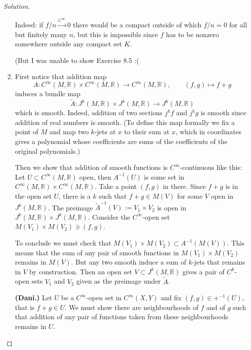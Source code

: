 \begin{proof}[Solution]
\begin{enumerate}[label=(\alph*)]
	Indeed: if \(f/n \xrightarrow{C^\infty} 0\) there would be a compact outside of which \(f/n=0\) for all but finitely many \(n\), but this is impossible since \(f\) has to be nonzero somewhere outside any compact set \(K\).

	(But I was unable to show Exercise 8.5 :(

\item 
	First notice that addition map
	\[A: C^\infty(M,\mathbb{R}) \times C^\infty(M,\mathbb{R}) \to C^\infty(M,\mathbb{R}),\qquad  (f,g)\mapsto  f+g\]
	induces a bundle map
\[\tilde{A}:J^{k}(M,\mathbb{R})\times J^{k}(M,\mathbb{R})\longrightarrow J^{k}(M,\mathbb{R})\]
which is smooth. Indeed, addition of two sections \(j^kf\) and \(j^kg\) is smooth since addition of real numbers is smooth. (To define this map formally we fix a point of \(M\) and map two \(k\)-jets at \(x\) to their sum at \(x\), which in coordinates gives a polynomial whose coefficients are sums of the coefficients of the original polynomials.)

Then we show that addition of smooth functions is \(C^\infty\)-continuous like this: Let \(U \subset C^\infty(M,\mathbb{R})\) open, then \(A^{-1}(U)\) is some set in \(C^\infty(M,\mathbb{R}) \times C^\infty (M,\mathbb{R})\). Take a point \((f,g)\) in there. Since \(f+g\) is in the open set \(U\), there is a \(k\) such that \(f+g \in M(V)\) for some \(V\) open in \(J^k(M,\mathbb{R})\). The preimage \(\tilde{A}^{-1}(V):=V_1\times V_2\) is open in \(J^k(M,\mathbb{R})\times J^{k}(M,\mathbb{R})\). Consider the \(C^\infty\)-open set \(M(V_1) \times M(V_2) \ni (f,g)\).

To conclude we must check that \(M(V_1)\times M(V_2) \subset A^{-1}(M(V))\). This means that the sum of any pair of smooth functions in \(M(V_1) \times M(V_2)\) remains in \(M(V)\). But any two smooth induce a sum of \(k\)-jets that remains in \(V\) by construction.
\iffalse
	Then an open set \(V \subset J^{k}(M,\mathbb{R})\) gives a pair of \(C^k\)-open sets \(V_1\) and \(V_2\) given as the preimage under \(\tilde{A}\). 

	\textbf{(Dani.)} Let \(U\) be a \(C^\infty\)-open set in \(C^\infty(X,Y)\) and fix \((f,g) \in +^{-1}(U)\), that is \(f+g \in U\). We must show there are neighbourhoods of \(f\) and of \(g\) such that addition of any pair of functions taken from these neighbourhoods remains in \(U\).



\end{enumerate}
\end{proof}

